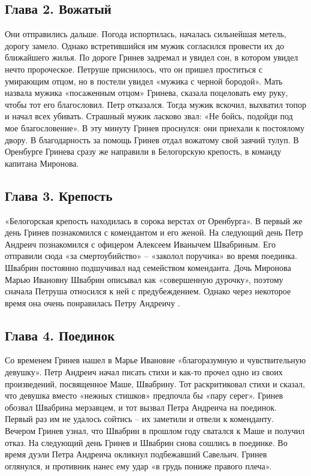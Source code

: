 \documentclass[a4paper,12pt]{article}
\begin{document}
\subsection{Глава 2. Вожатый}

Они отправились дальше. Погода испортилась, началась сильнейшая метель, дорогу замело. Однако встретившийся им мужик согласился провести их до ближайшего жилья.
По дороге Гринев задремал и увидел сон, в котором увидел нечто пророческое. Петруше приснилось, что он пришел проститься с умирающим отцом, но в постели увидел «мужика с черной бородой». Мать назвала мужика «посаженным отцом» Гринева, сказала поцеловать ему руку, чтобы тот его благословил. Петр отказался. Тогда мужик вскочил, выхватил топор и начал всех убивать. Страшный мужик ласково звал: «Не бойсь, подойди под мое благословение». В эту минуту Гринев проснулся: они приехали к постоялому двору. В благодарность за помощь Гринев отдал вожатому свой заячий тулуп.
В Оренбурге Гринева сразу же направили в Белогорскую крепость, в команду капитана Миронова.

\subsection{Глава 3. Крепость}

«Белогорская крепость находилась в сорока верстах от Оренбурга». В первый же день Гринев познакомился с комендантом и его женой. На следующий день Петр Андреич познакомился с офицером Алексеем Иванычем Швабриным. Его отправили сюда «за смертоубийство» – «заколол поручика» во время поединка. Швабрин постоянно подшучивал над семейством коменданта. Дочь Миронова Марью Ивановну Швабрин описывал как «совершенную дурочку», поэтому сначала Петруша относился к ней с предубеждением. Однако через некоторое время она очень понравилась Петру Андреичу .

\subsection{Глава 4. Поединок}

Со временем Гринев нашел в Марье Ивановне «благоразумную и чувствительную девушку». Петр Андреич начал писать стихи и как-то прочел одно из своих произведений, посвященное Маше, Швабрину. Тот раскритиковал стихи и сказал, что девушка вместо «нежных стишков» предпочла бы «пару серег». Гринев обозвал Швабрина мерзавцем, и тот вызвал Петра Андреича на поединок. Первый раз им не удалось сойтись – их заметили и отвели к коменданту. Вечером Гринев узнал, что Швабрин в прошлом году сватался к Маше и получил отказ.
На следующий день Гринев и Швабрин снова сошлись в поединке. Во время дуэли Петра Андреича окликнул подбежавший Савельич. Гринев оглянулся, и противник нанес ему удар «в грудь пониже правого плеча».
\end{document}
